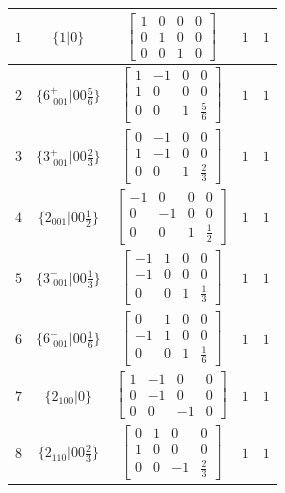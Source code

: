 \documentclass[fleqn,8pt]{jsarticle}
\begin{document}
\begin{longtable}{ccccc}
$ 1 $ & $ \{1|0\} $ & $ \begin{bmatrix} 1 & 0 & 0 & 0 \\ 0 & 1 & 0 & 0 \\ 0 & 0 & 1 & 0 \end{bmatrix} $ & $ 1 $ & $ 1 $ \\ \hline
$ 2 $ & $ \{6^{+}_{\,\,001}|0 0 \frac{5}{6}\} $ & $ \begin{bmatrix} 1 & -1 & 0 & 0 \\ 1 & 0 & 0 & 0 \\ 0 & 0 & 1 & \frac{5}{6} \end{bmatrix} $ & $ 1 $ & $ 1 $ \\ \hline
$ 3 $ & $ \{3^{+}_{\,\,001}|0 0 \frac{2}{3}\} $ & $ \begin{bmatrix} 0 & -1 & 0 & 0 \\ 1 & -1 & 0 & 0 \\ 0 & 0 & 1 & \frac{2}{3} \end{bmatrix} $ & $ 1 $ & $ 1 $ \\ \hline
$ 4 $ & $ \{2{}_{001}|0 0 \frac{1}{2}\} $ & $ \begin{bmatrix} -1 & 0 & 0 & 0 \\ 0 & -1 & 0 & 0 \\ 0 & 0 & 1 & \frac{1}{2} \end{bmatrix} $ & $ 1 $ & $ 1 $ \\ \hline
$ 5 $ & $ \{3^{-}_{\,\,001}|0 0 \frac{1}{3}\} $ & $ \begin{bmatrix} -1 & 1 & 0 & 0 \\ -1 & 0 & 0 & 0 \\ 0 & 0 & 1 & \frac{1}{3} \end{bmatrix} $ & $ 1 $ & $ 1 $ \\ \hline
$ 6 $ & $ \{6^{-}_{\,\,001}|0 0 \frac{1}{6}\} $ & $ \begin{bmatrix} 0 & 1 & 0 & 0 \\ -1 & 1 & 0 & 0 \\ 0 & 0 & 1 & \frac{1}{6} \end{bmatrix} $ & $ 1 $ & $ 1 $ \\ \hline
$ 7 $ & $ \{2{}_{100}|0\} $ & $ \begin{bmatrix} 1 & -1 & 0 & 0 \\ 0 & -1 & 0 & 0 \\ 0 & 0 & -1 & 0 \end{bmatrix} $ & $ 1 $ & $ 1 $ \\ \hline
$ 8 $ & $ \{2{}_{110}|0 0 \frac{2}{3}\} $ & $ \begin{bmatrix} 0 & 1 & 0 & 0 \\ 1 & 0 & 0 & 0 \\ 0 & 0 & -1 & \frac{2}{3} \end{bmatrix} $ & $ 1 $ & $ 1 $ \\ \hline

\end{longtable}
\end{document}
